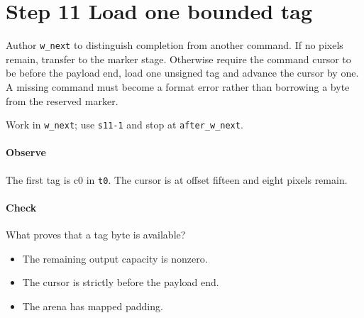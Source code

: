 \section{Step 11 Load one bounded tag}\label{qoi-s11}
Author \texttt{w\_next} to distinguish completion from another command. If no pixels remain, transfer to the marker stage. Otherwise require the command cursor to be before the payload end, load one unsigned tag and advance the cursor by one. A missing command must become a format error rather than borrowing a byte from the reserved marker.

Work in \texttt{w\_next}; use \texttt{s11-1} and stop at \texttt{after\_w\_next}.

\paragraph{Observe} The first tag is c0 in \texttt{t0}. The cursor is at offset fifteen and eight pixels remain.

\paragraph{Check} What proves that a tag byte is available?
\begin{itemize}
  \item[A.] The remaining output capacity is nonzero.
  \item[B.] The cursor is strictly before the payload end.
  \item[C.] The arena has mapped padding.
\end{itemize}
